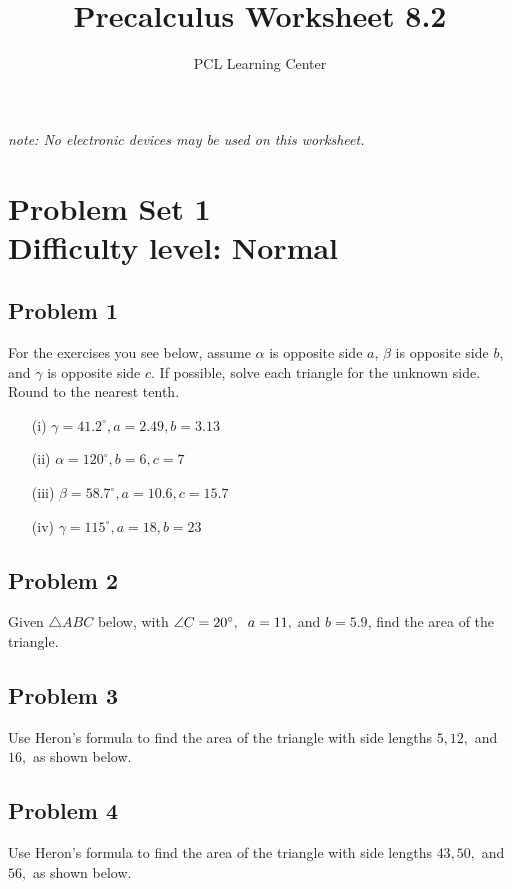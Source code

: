 \documentclass[12pt]{article}
\title{Precalculus Worksheet 8.2}
\author{PCL Learning Center}
\date{}
\begin{document}
\maketitle

\begin{center}
    \textit{note: No electronic devices may be used on this worksheet.}    
\end{center}

\section*{Problem Set 1\\Difficulty level: Normal}
\subsection*{Problem 1}
For the exercises you see below, assume \(\alpha\) is opposite side \(a\), \(\beta\) is opposite side \(b\), and \(\gamma\) is opposite side \(c\). If possible, solve each triangle for the unknown side. Round to the nearest tenth.

    \begin{itemize}
        \item[(i)] \(\gamma = 41.2^{\circ}, a=2.49, b=3.13\)
        \item[(ii)] \(\alpha=120^{\circ},b=6,c=7\)
        \item[(iii)] \(\beta=58.7^{\circ},a=10.6,c=15.7\)
        \item[(iv)] \(\gamma=115^{\circ},a=18,b=23\)
    \end{itemize}

\subsection*{Problem 2}
Given \(\triangle ABC\) below, with \(\angle C=20^{\circ}, \hspace{0.2cm} a=11,\) and \(b=5.9\), find the area of the triangle.

\subsection*{Problem 3}
Use Heron's formula to find the area of the triangle with side lengths \(5,12,\) and \(16,\) as shown below.

\subsection*{Problem 4}
Use Heron's formula to find the area of the triangle with side lengths \(43,50,\) and \(56,\) as shown below.
\end{document}
